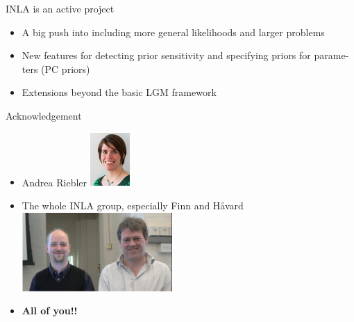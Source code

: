 \documentclass[
  ignorenonframetext,
]{beamer}
\begin{document}
\begin{frame}{INLA is an active project}
\protect\hypertarget{inla-is-an-active-project}{}
\begin{itemize}
\item
  A big push into including more general likelihoods and larger problems
\item
  New features for detecting prior sensitivity and specifying priors for
  parame- ters (PC priors)
\item
  Extensions beyond the basic LGM framework
\end{itemize}
\end{frame}

\begin{frame}{Acknowledgement}
\protect\hypertarget{acknowledgement}{}
\begin{itemize}
\item
  Andrea Riebler
  \includegraphics[width=0.12\textwidth,height=\textheight]{graphics/andrerie.jpg}
\item
  The whole INLA group, especially Finn and Håvard
  \includegraphics[width=0.45\textwidth,height=\textheight]{graphics/Finn_Havard.png}
\item
  \textbf{All of you!!}
\end{itemize}
\end{frame}
\end{document}
